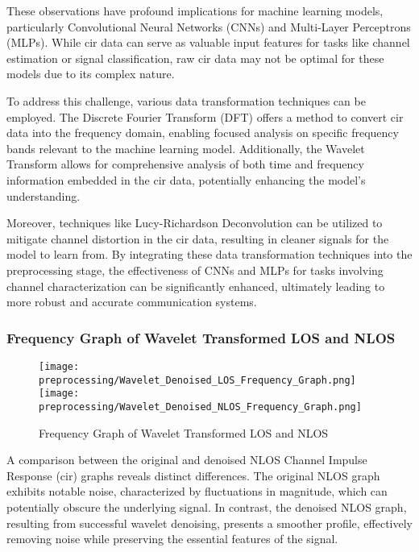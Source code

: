 These observations have profound implications for machine learning models, particularly Convolutional Neural Networks (CNNs) and Multi-Layer Perceptrons (MLPs). While \acrshort{cir} data can serve as valuable input features for tasks like channel estimation or signal classification, raw \acrshort{cir} data may not be optimal for these models due to its complex nature.

To address this challenge, various data transformation techniques can be employed. The Discrete Fourier Transform (DFT) offers a method to convert \acrshort{cir} data into the frequency domain, enabling focused analysis on specific frequency bands relevant to the machine learning model. Additionally, the Wavelet Transform allows for comprehensive analysis of both time and frequency information embedded in the \acrshort{cir} data, potentially enhancing the model's understanding.

Moreover, techniques like Lucy-Richardson Deconvolution can be utilized to mitigate channel distortion in the \acrshort{cir} data, resulting in cleaner signals for the model to learn from. By integrating these data transformation techniques into the preprocessing stage, the effectiveness of CNNs and MLPs for tasks involving channel characterization can be significantly enhanced, ultimately leading to more robust and accurate communication systems.



\subsubsection{Frequency Graph of Wavelet Transformed LOS and NLOS}\label{frequency_graph_wavelet}

\begin{figure}[H] 
  \centering
  \texttt{[image: preprocessing/Wavelet\_Denoised\_LOS\_Frequency\_Graph.png]}
  \texttt{[image: preprocessing/Wavelet\_Denoised\_NLOS\_Frequency\_Graph.png]}
  \caption{Frequency Graph of Wavelet Transformed LOS and NLOS}\label{fig:frequency_graph_wavelet}
\end{figure}

A comparison between the original and denoised NLOS Channel Impulse Response (\acrshort{cir}) graphs reveals distinct differences. The original NLOS graph exhibits notable noise, characterized by fluctuations in magnitude, which can potentially obscure the underlying signal. In contrast, the denoised NLOS graph, resulting from successful wavelet denoising, presents a smoother profile, effectively removing noise while preserving the essential features of the signal.

